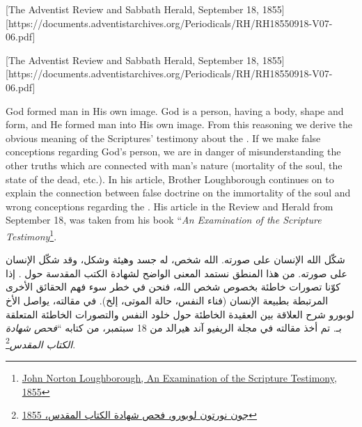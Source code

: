 [The Adventist Review and Sabbath Herald, September 18, 1855][https://documents.adventistarchives.org/Periodicals/RH/RH18550918-V07-06.pdf]


[The Adventist Review and Sabbath Herald, September 18, 1855][https://documents.adventistarchives.org/Periodicals/RH/RH18550918-V07-06.pdf]


God formed man in His own image. God is a person, having a body, shape and form, and He formed man into His own image. From this reasoning we derive the obvious meaning of the Scriptures’ testimony about the . If we make false conceptions regarding God’s person, we are in danger of misunderstanding the other truths which are connected with man’s nature (mortality of the soul, the state of the dead, etc.). In his article, Brother Loughborough continues on to explain the connection between false doctrine on the immortality of the soul and wrong conceptions regarding the . His article in the Review and Herald from September 18, was taken from his book “\textit{An Examination of the Scripture Testimony}\footnote{\href{https://egwwritings.org/?ref=en_MPC.2&para=961.2}{John Norton Loughborough, An Examination of the Scripture Testimony, 1855}}.


شكّل الله الإنسان على صورته. الله شخص، له جسد وهيئة وشكل، وقد شكّل الإنسان على صورته. من هذا المنطق نستمد المعنى الواضح لشهادة الكتب المقدسة حول . إذا كوّنا تصورات خاطئة بخصوص شخص الله، فنحن في خطر سوء فهم الحقائق الأخرى المرتبطة بطبيعة الإنسان (فناء النفس، حالة الموتى، إلخ). في مقالته، يواصل الأخ لوبورو شرح العلاقة بين العقيدة الخاطئة حول خلود النفس والتصورات الخاطئة المتعلقة بـ. تم أخذ مقالته في مجلة الريفيو آند هيرالد من 18 سبتمبر، من كتابه “\textit{فحص شهادة الكتاب المقدس}\footnote{\href{https://egwwritings.org/?ref=en_MPC.2&para=961.2}{جون نورتون لوبورو، فحص شهادة الكتاب المقدس، 1855}}.


